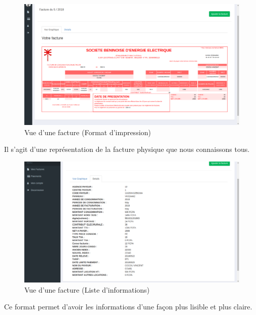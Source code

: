 	  \begin{figure}[H]
	      \begin{center}
		  \includegraphics[scale=0.35]{images/graphic.png}
	      \end{center}
	      \caption{Vue d'une facture (Format d'impression)}
	      \label{Page de la whitelist Port}
	  \end{figure}
	  Il s'agit d'une repr\'esentation de la facture physique que nous connaissons tous.
						      
	  \begin{figure}[H]
	      \begin{center}
		  \includegraphics[scale=0.35]{images/details.png}
	      \end{center}
	      \caption{Vue d'une facture (Liste d'informations)}
	      \label{Page de la whitelist Port}
	  \end{figure}
	  Ce format permet d'avoir les informations d'une fa\c{c}on plus lisible et plus claire.
			      
